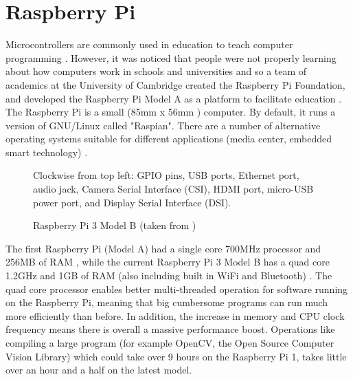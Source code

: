 \documentclass[twoside,a4]{report}
\def\br{\newline \newline \noindent}
\begin{document}
	\section{Raspberry Pi} %
	\noindent
	Microcontrollers are commonly used in education to teach computer programming \cite{backmcedu1, backmcedu2}. However, it was noticed that people were not properly learning about how computers work in schools and universities and so a team of academics at the University of Cambridge created the Raspberry Pi Foundation, and developed the Raspberry Pi Model A as a platform to facilitate education \cite{pihistory}. The Raspberry Pi is a small (85mm x 56mm \cite{pi3mechdraw}) computer. By default, it runs a version of GNU/Linux called "Raspian". There are a number of alternative operating systems suitable for different applications (media center, embedded smart technology) \cite{piotheros}.  \newline
	\begin{figure}[!htb]
	\centering
	\caption{Raspberry Pi 3 Model B (taken from  \cite{pi3info})}
	\label{pidia}
	\footnotesize Clockwise from top left: GPIO pins, USB ports, Ethernet port, audio jack, Camera Serial Interface (CSI), HDMI port, micro-USB power port, and Display Serial Interface (DSI).
	\end{figure} \newline%
	The first Raspberry Pi (Model A) had a single core 700MHz processor and 256MB of RAM \cite{pi1info}, while the current Raspberry Pi 3 Model B has a quad core 1.2GHz and 1GB of RAM (also including built in WiFi and Bluetooth) \cite{pi3info}. The quad core processor enables better multi-threaded operation for software running on the Raspberry Pi, meaning that big cumbersome programs can run much more efficiently than before. In addition, the increase in memory and CPU clock frequency means there is overall a massive performance boost. Operations like compiling a large program (for example OpenCV, the Open Source Computer Vision Library) which could take over 9 hours \cite{pipowercompold} on the Raspberry Pi 1, takes little over an hour and a half \cite{pipowercompnew} on the latest model.\br
\end{document}
